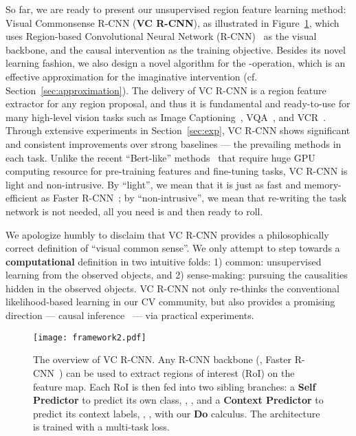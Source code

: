 \documentclass[10pt,twocolumn,letterpaper]{article}
\begin{document}
So far, we are ready to present our unsupervised region feature learning method: Visual Commonsense R-CNN (\textbf{VC R-CNN}), as illustrated in Figure~\ref{fig:framework}, which uses Region-based Convolutional Neural Network (R-CNN)~\cite{ren2015faster} as the visual backbone, and the causal intervention as the training objective. Besides its novel learning fashion, we also design a novel algorithm for the -operation, which is an effective approximation for the imaginative intervention (cf. Section~\ref{sec:approximation}). 
The delivery of VC R-CNN is a region feature extractor for any region proposal, and thus it is fundamental and ready-to-use for many high-level vision tasks such as Image Captioning~\cite{vinyals2015show}, VQA~\cite{antol2015vqa}, and VCR~\cite{zellers2019recognition}. Through extensive experiments in Section~\ref{sec:exp}, VC R-CNN shows significant and consistent improvements over strong baselines --- the prevailing methods in each task. Unlike the recent ``Bert-like'' methods~\cite{lu2019vilbert, sun2019videobert} that require huge GPU computing resource for pre-training features and fine-tuning tasks, VC R-CNN is light and non-intrusive. By ``light'', we mean that it is just as fast and memory-efficient as Faster R-CNN~\cite{ren2015faster}; by ``non-intrusive'', we mean that re-writing the task network is not needed, all you need is \texttt{\color{blue}{numpy.concatenate}} and then ready to roll.

We apologize humbly to disclaim that VC R-CNN provides a philosophically correct definition of ``visual common sense''. We only attempt to step towards a \textbf{computational} definition in two intuitive folds: 1) common: unsupervised learning from the observed objects, and 2) sense-making: pursuing the causalities hidden in the observed objects. VC R-CNN not only re-thinks the conventional likelihood-based learning in our CV community, but also provides a promising direction --- causal inference~\cite{pearl2018book} --- via practical experiments.


\begin{figure}[t]
\begin{center}
\texttt{[image: framework2.pdf]}
\end{center}
   \caption{The overview of VC R-CNN. Any R-CNN backbone (\eg, Faster R-CNN~\cite{ren2015faster}) can be used to extract regions of interest (RoI) on the feature map. Each RoI is then fed into two sibling branches: a \textbf{Self Predictor} to predict its own class, \eg, , and a \textbf{Context Predictor} to predict its context labels, \eg, , with our \textbf{Do} calculus. The architecture is trained with a multi-task loss.}
\label{fig:framework}
\vspace{-0.1in}
\end{figure}
\end{document}
